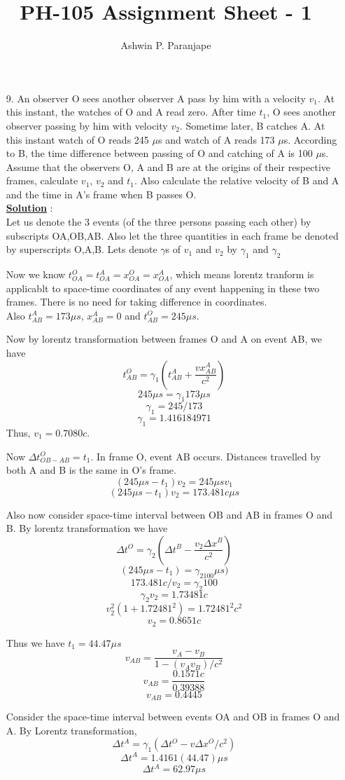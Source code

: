 \documentclass[10pt, a4paper]{article}
\begin{document}
\title{PH-105 Assignment Sheet - 1}
\author{Ashwin P. Paranjape}
\date{}
\maketitle
\begin{enumerate}
\item[9.]{An observer O sees another observer A pass by him with a velocity $v_1$. At this instant, the watches of O and  A read zero. After time $t_1$, O sees another observer passing by him with velocity $v_2$. Sometime later, B catches A. At this instant watch of O reads 245 $\mu$s and watch of A reads 173 $\mu$s. According to B, the time difference between passing of O and catching of A is 100 $\mu$s. Assume that the observers O, A and B are at the origins of their respective frames, calculate $v_1$, $v_2$ and $t_1$. Also calculate the relative velocity of B and A and the time in A's frame when B passes O.}\\
{\underline {\bf Solution}} : \\
Let us denote the 3 events (of the three persons passing each other) by subscripts OA,OB,AB. Also let the three quantities in each frame be denoted by superscripts O,A,B. Lets denote $\gamma$s of $v_1$ and $v_2$ by $\gamma_1$ and $\gamma_2$

Now we know $t_{OA}^{O}=t_{OA}^{A}=x_{OA}^{O}=x_{OA}^{A}$, which means lorentz tranform is applicablt to space-time coordinates of any event happening in these two frames. There is no need for taking difference in coordinates.\\
 Also $t_{AB}^{A}=173\mu s$, $x_{AB}^{A}=0$ and $t_{AB}^{O} = 245 \mu s$. 

Now by lorentz transformation between frames O and A on event AB, we have
\[t_{AB}^{O} = \gamma_1 (t_{AB}^{A} + \frac{vx_{AB}^{A}}{c^2})\]
\[245 \mu s = \gamma_1 173\mu s\]
\[\gamma_1 = 245/173 \]
\[ \gamma_1 = 1.416184971 \]
Thus, $v_1 = 0.7080 c$.

Now $\Delta t_{OB-AB}^O = t_1$. In frame O, event AB occurs. Distances travelled by both A and B is the same in O's frame.
\[(245 \mu s -t_1)v_2 = 245 \mu s v_1\]
\[(245 \mu s -t_1) v_2 = 173.481c \mu s\]

Also now consider space-time interval between OB and AB in frames O and B.
By lorentz transformation we have
\[\Delta t^O=\gamma_2(\Delta t^B - \frac{v_2 \Delta x^B }{c^2}) \]
\[(245 \mu s - t_1) = \gamma_2100 \mu s) \]
\[173.481c/v_2 = \gamma_2 100\]
\[\gamma_2 v_2 = 1.73481 c \]
\[v_2 ^2 (1+1.72481^2) = 1.72481^2c^2\]                                                          
\[v_2 = 0.8651c \]

Thus we have $t_1=44.47 \mu s$
\[v_{AB}=\frac{v_A-v_B}{1-(v_A v_B)/c^2}\]
\[v_{AB}=\frac{0.1571c}{0.39388}\]
\[v_{AB}=0.4445\]

Consider the space-time interval between events OA and OB in frames O and A.
By Lorentz transformation,
\[\Delta t^A=\gamma_1(\Delta t^O-v\Delta x^O/c^2)\]
\[\Delta t^A= 1.4161(44.47)\mu s\]
\[\Delta t^A= 62.97 \mu s\]
\end{enumerate}
\end{document}
